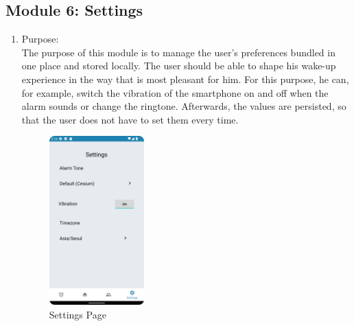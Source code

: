 \documentclass[conference]{IEEEtran}
\begin{document}
\subsection{Module 6: Settings}
\begin{enumerate}
    \item Purpose: \\
    The purpose of this module is to manage the user's preferences bundled in one place and stored locally. The user should be able to shape his wake-up experience in the way that is most pleasant for him. For this purpose, he can, for example, switch the vibration of the smartphone on and off when the alarm sounds or change the ringtone. Afterwards, the values are persisted, so that the user does not have to set them every time.\\ 
    \begin{figure}[htbp]
        \centerline{\includegraphics[height=65mm,scale=0.5]{Images/App_Settings.png}}
        \caption{Settings Page}
        \label{fig}
    \end{figure}
    

\end{enumerate}
\end{document}
